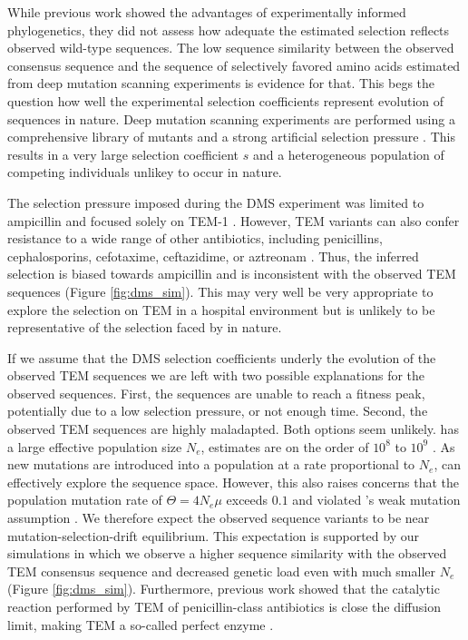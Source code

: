 \documentclass[12pt]{article}
\begin{document}
While previous work showed the advantages of experimentally informed phylogenetics, they did not assess how adequate the estimated selection reflects observed wild-type sequences.
The low sequence similarity between the observed consensus sequence and the sequence of selectively favored amino acids estimated from deep mutation scanning experiments is evidence for that.
This begs the question how well the experimental selection coefficients represent evolution of sequences in nature.
Deep mutation scanning experiments are performed using a comprehensive library of mutants and a strong artificial selection pressure \citep{FirnbergAndOstermeier2012, Jain2014, FowlerAndFields2014, Fowler2014}.
This results in a very large selection coefficient $s$ and a heterogeneous population of competing individuals unlikey to occur in nature.

The selection pressure imposed during the DMS experiment was limited to ampicillin and focused solely on TEM-1 \citep{stiffler2016}.
However, TEM variants can also confer resistance to a wide range of other antibiotics, including penicillins, cephalosporins, cefotaxime, ceftazidime, or aztreonam \citep{sougakoff1988,sougakoff1989,goussard1991,mabilat1992,chanal1992,brun1994}.
Thus, the inferred selection is biased towards ampicillin and is inconsistent with the observed TEM sequences (Figure \ref{fig:dms_sim}).
This may very well be very appropriate to explore the selection on TEM in a hospital environment but is unlikely to be representative of the selection faced by \ecoli in nature.


If we assume that the DMS selection coefficients underly the evolution of the observed TEM sequences we are left with two possible explanations for the observed sequences.
First, the sequences are unable to reach a fitness peak, potentially due to a low selection pressure, or not enough time.
Second, the observed TEM sequences are highly maladapted.
Both options seem unlikely.
\ecoli has a large effective population size $N_e$, estimates are on the order of $10^8$ to $10^9$ \citep{OchmanAndWilson1987, hartl1994}.
As new mutations are introduced into a population at a rate proportional to $N_e$, \ecoli can effectively explore the sequence space.
However, this also raises concerns that the population mutation rate of \ecoli $\Theta = 4N_e\mu$ exceeds $0.1$ and violated \selac's weak mutation assumption \citep{deKoning259507}.
We therefore expect the observed sequence variants to be near mutation-selection-drift equilibrium.
This expectation is supported by our simulations in which we observe a higher sequence similarity with the observed TEM consensus sequence and decreased genetic load even with much smaller $N_e$ (Figure \ref{fig:dms_sim}).
Furthermore, previous work showed that the catalytic reaction performed by TEM of penicillin-class antibiotics is close the diffusion limit, making TEM a so-called perfect enzyme \citep{matagne1998}.
\end{document}
